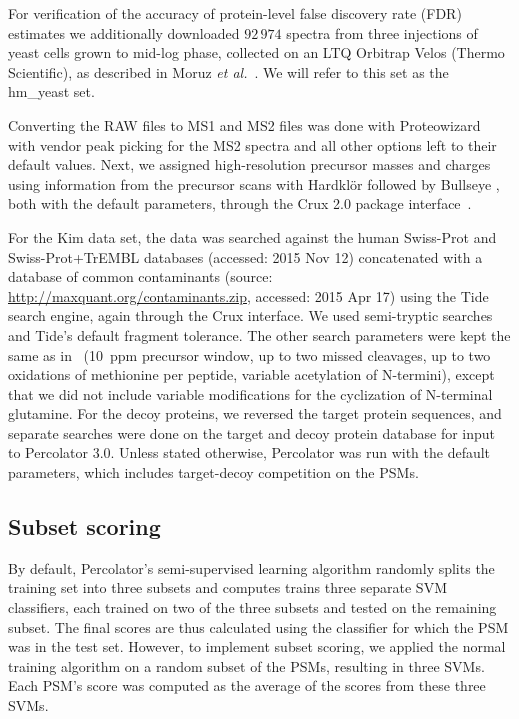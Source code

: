 \documentclass{article}
\begin{document}
For verification of the accuracy of protein-level false discovery rate 
(FDR) estimates we additionally downloaded $92\,974$ spectra from 
three injections of yeast cells grown to mid-log phase, collected on 
an LTQ Orbitrap Velos (Thermo Scientific), as described in Moruz {\em 
et al.}~\cite{moruz2013}.  We will refer to this set as the hm\_yeast 
set.

Converting the RAW files to MS1 and MS2 files was done with
Proteowizard~\cite{kessner2008} with vendor peak picking for the MS2
spectra and all other options left to their default values.  Next, we
assigned high-resolution precursor masses and charges using
information from the precursor scans with Hardkl\"{o}r
\cite{hoopmann2007} followed by Bullseye \cite{hsieh2009}, both with
the default parameters, through the Crux 2.0 package
interface~\cite{mcilwain2014}.

For the Kim data set, the data was searched against the human
Swiss-Prot and Swiss-Prot+TrEMBL databases (accessed: 2015 Nov 12)
concatenated with a database of common contaminants (source:
\url{http://maxquant.org/contaminants.zip}, accessed: 2015 Apr 17)
using the Tide search engine, again through the Crux interface. We
used semi-tryptic searches and Tide's default fragment tolerance. The
other search parameters were kept the same as in~\cite{kim2014draft}
(10~ppm precursor window, up to two missed cleavages, up to two
oxidations of methionine per peptide, variable acetylation of
N-termini), except that we did not include variable modifications for
the cyclization of N-terminal glutamine.  For the decoy proteins, we
reversed the target protein sequences, and separate searches were done
on the target and decoy protein database for input to Percolator
3.0. Unless stated otherwise, Percolator was run with the default
parameters, which includes target-decoy competition on the PSMs.

\subsection*{Subset scoring}

By default, Percolator's semi-supervised learning algorithm randomly
splits the training set into three subsets and computes trains three
separate SVM classifiers, each trained on two of the three subsets and
tested on the remaining subset.  The final scores are thus calculated
using the classifier for which the PSM was in the test set. However,
to implement subset scoring, we applied the normal training algorithm
on a random subset of the PSMs, resulting in three SVMs.  Each PSM's
score was computed as the average of the scores from these three SVMs.
\end{document}
